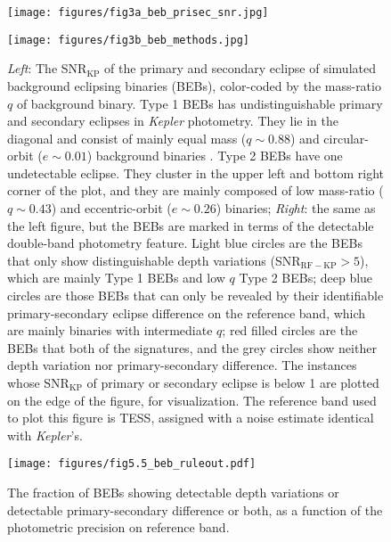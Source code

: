 \documentclass{aastex63}
\begin{document}
    \begin{figure}
        \centering
        \begin{minipage}[t]{0.475\linewidth}
        \centering
         \texttt{[image: figures/fig3a\_beb\_prisec\_snr.jpg]}
        \end{minipage}%
        \begin{minipage}[t]{0.4\textwidth}
        \centering
         \texttt{[image: figures/fig3b\_beb\_methods.jpg]}
        \end{minipage}%
        \caption{\emph{Left}: The SNR$_\mathrm{KP}$ of the primary and secondary eclipse of simulated background eclipsing binaries (BEBs), color-coded by the mass-ratio $q$ of background binary. Type 1 BEBs has undistinguishable primary and secondary eclipses in \emph{Kepler} photometry. They lie in the diagonal and consist of mainly equal mass ($q\sim0.88$) and circular-orbit ($e\sim0.01$) background binaries . Type 2 BEBs have one undetectable eclipse. They cluster in the upper left and bottom right corner of the plot, and they are mainly composed of low mass-ratio ($q\sim0.43$) and eccentric-orbit ($e\sim0.26$) binaries; \emph{Right}: the same as the left figure, but the BEBs are marked in terms of the detectable double-band photometry feature. Light blue circles are the BEBs that only show distinguishable depth variations (SNR$_\mathrm{RF-KP}>5$), which are mainly Type 1 BEBs and low $q$ Type 2 BEBs; deep blue circles are those BEBs that can only be revealed by their identifiable primary-secondary eclipse difference on the reference band, which are mainly binaries with intermediate $q$; red filled circles are the BEBs that both of the signatures, and the grey circles show neither depth variation nor primary-secondary difference. The instances whose SNR$_\mathrm{KP}$ of primary or secondary eclipse is below 1 are plotted on the edge of the figure, for visualization. The reference band used to plot this figure is TESS, assigned with a noise estimate identical with \emph{Kepler}'s. }
        \label{fig:beb_prop}
    \end{figure}
    
    \begin{figure}
        \centering
        \texttt{[image: figures/fig5.5\_beb\_ruleout.pdf]}
        \caption{The fraction of BEBs showing detectable depth variations or detectable primary-secondary difference or both, as a function of the photometric precision on reference band. }
        \label{fig:beb_ruleout}
    \end{figure}
\end{document}
